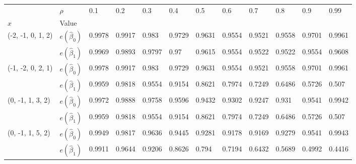 \begin{tabular}{llllllllllll}
\toprule
                 & $\rho$ &    0.1 &    0.2 &    0.3 &    0.4 &    0.5 &    0.6 &    0.7 &    0.8 &    0.9 &   0.99 \\
$x$ & Value &        &        &        &        &        &        &        &        &        &        \\
\midrule
(-2, -1, 0, 1, 2) & $e(\hat{\beta}_0)$ & 0.9978 & 0.9917 &  0.983 & 0.9729 & 0.9631 & 0.9554 & 0.9521 & 0.9558 & 0.9701 & 0.9961 \\
                 & $e(\hat{\beta}_1)$ & 0.9969 & 0.9893 & 0.9797 &   0.97 & 0.9615 & 0.9554 & 0.9522 & 0.9522 & 0.9554 & 0.9608 \\
(-1, -2, 0, 2, 1) & $e(\hat{\beta}_0)$ & 0.9978 & 0.9917 &  0.983 & 0.9729 & 0.9631 & 0.9554 & 0.9521 & 0.9558 & 0.9701 & 0.9961 \\
                 & $e(\hat{\beta}_1)$ & 0.9959 & 0.9818 & 0.9554 & 0.9154 & 0.8621 & 0.7974 & 0.7249 & 0.6486 & 0.5726 &  0.507 \\
(0, -1, 1, 3, 2) & $e(\hat{\beta}_0)$ & 0.9972 & 0.9888 & 0.9758 & 0.9596 & 0.9432 & 0.9302 & 0.9247 &  0.931 & 0.9541 & 0.9942 \\
                 & $e(\hat{\beta}_1)$ & 0.9959 & 0.9818 & 0.9554 & 0.9154 & 0.8621 & 0.7974 & 0.7249 & 0.6486 & 0.5726 &  0.507 \\
(0, -1, 1, 5, 2) & $e(\hat{\beta}_0)$ & 0.9949 & 0.9817 & 0.9636 & 0.9445 & 0.9281 & 0.9178 & 0.9169 & 0.9279 & 0.9541 & 0.9943 \\
                 & $e(\hat{\beta}_1)$ & 0.9911 & 0.9644 & 0.9206 & 0.8626 &  0.794 & 0.7194 & 0.6432 & 0.5689 & 0.4992 & 0.4416 \\
\bottomrule
\end{tabular}
